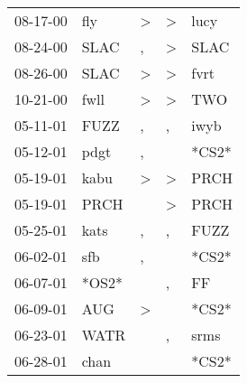 \begin{supertabular}{p{0.07\textwidth}p{0.06\textwidth}p{0.02\textwidth}p{0.02\textwidth}p{0.06\textwidth}}
          08-17-00\textsuperscript{} &            fly\textsuperscript{} &     \textgreater &     \textgreater &           lucy\textsuperscript{} \\
          08-24-00\textsuperscript{} &           SLAC\textsuperscript{} &                , &     \textgreater &           SLAC\textsuperscript{} \\
          08-26-00\textsuperscript{} &           SLAC\textsuperscript{} &     \textgreater &     \textgreater &           fvrt\textsuperscript{} \\
          10-21-00\textsuperscript{} &           fwll\textsuperscript{} &     \textgreater &     \textgreater &            TWO\textsuperscript{} \\
          05-11-01\textsuperscript{} &           FUZZ\textsuperscript{} &                , &                , &           iwyb\textsuperscript{} \\
          05-12-01\textsuperscript{} &           pdgt\textsuperscript{} &                , &                  &                            *CS2* \\
          05-19-01\textsuperscript{} &           kabu\textsuperscript{} &     \textgreater &     \textgreater &           PRCH\textsuperscript{} \\
          05-19-01\textsuperscript{} &           PRCH\textsuperscript{} &                  &     \textgreater &           PRCH\textsuperscript{} \\
          05-25-01\textsuperscript{} &           kats\textsuperscript{} &                , &                , &           FUZZ\textsuperscript{} \\
          06-02-01\textsuperscript{} &            sfb\textsuperscript{} &                , &                  &                            *CS2* \\
          06-07-01\textsuperscript{} &                            *OS2* &                  &                , &             FF\textsuperscript{} \\
          06-09-01\textsuperscript{} &            AUG\textsuperscript{} &     \textgreater &                  &                            *CS2* \\
          06-23-01\textsuperscript{} &           WATR\textsuperscript{} &                  &                , &           srms\textsuperscript{} \\
          06-28-01\textsuperscript{} &           chan\textsuperscript{} &                  &                  &                            *CS2* \\

\end{supertabular}
